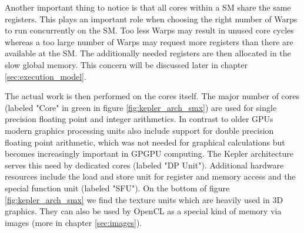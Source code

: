 
Another important thing to notice is that all cores within a SM share the same registers. This plays an important role when choosing the right number of Warps to run concurrently on the SM. Too less Warps may result in unused core cycles whereas a too large number of Warps may request more registers than there are available at the SM. The additionally needed registers are then allocated in the slow global memory. This concern will be discussed later in chapter \ref{sec:execution_model}.

The actual work is then performed on the cores itself. The major number of cores (labeled "Core" in green in figure \ref{fig:kepler_arch_smx}) are used for single precision floating point and integer arithmetics. In contrast to older GPUs modern graphics processing units also include support for double precision floating point arithmetic, which was not needed for graphical calculations but becomes increasingly important in GPGPU computing. The Kepler architecture serves this need by dedicated cores (labeled "DP Unit"). Additional hardware resources include the load and store unit for register and memory access and the special function unit (labeled "SFU"). On the bottom of figure \ref{fig:kepler_arch_smx} we find the texture units which are heavily used in 3D graphics. They can also be used by OpenCL as a special kind of memory via images (more in chapter \ref{sec:images}).

